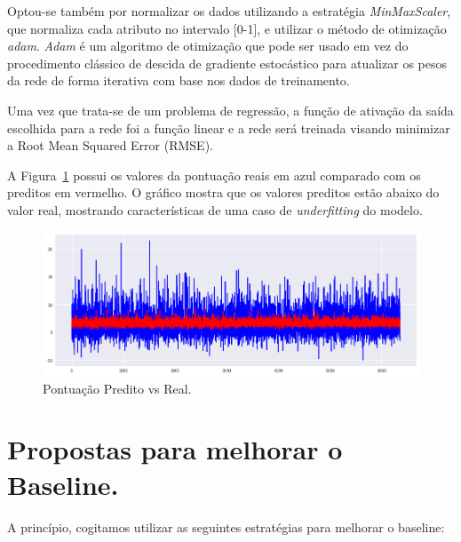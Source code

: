 \documentclass[conference]{IEEEtran}
\newcommand{\rfig}[1]{Figura~\ref{fig:#1}}
\newcommand{\tit}[1]{{\textit{#1}}}
\begin{document}
Optou-se  também por  normalizar  os dados  utilizando a  estratégia
\tit{MinMaxScaler}, que normaliza cada  atributo no intervalo [0-1], e
utilizar  o  método  de  otimização \tit{adam}.  \tit{Adam}  é  um
algoritmo de  otimização que pode  ser usado em vez  do procedimento
clássico de descida de gradiente estocástico para atualizar os pesos
da rede de forma iterativa com base nos dados de treinamento.

Uma  vez que  trata-se de  um problema  de regressão,  a função  de
ativação da saída  escolhida para a rede foi a  função linear e a
rede  será  treinada visando  minimizar  a  Root Mean  Squared  Error
(RMSE).

A   \rfig{predict}  possui   os  valores   da  pontuação   reais  em
azul  comparado  com  os  preditos  em  vermelho.  O  gráfico  mostra
que  os  valores  preditos  estão abaixo  do  valor  real,  mostrando
características de uma caso de \tit{underfitting} do modelo.

\begin{figure}[h]
  \centering
  \includegraphics[width=\linewidth]{images/predict.png}
  \caption{Pontuação Predito vs Real.}
  \label{fig:predict}
\end{figure}

\section{Propostas para melhorar o Baseline.}

A  princípio,  cogitamos  utilizar  as  seguintes  estratégias  para
melhorar o baseline:
\end{document}
